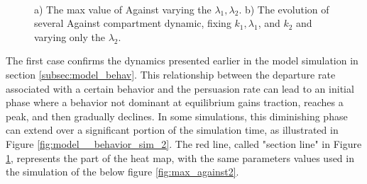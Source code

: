\begin{figure}[h]
	\centering
	 \quad
	 \\
	\caption[Max against first case]{a) The max value of Against varying the $\lambda_1, \lambda_2$. b) The evolution of several Against compartment dynamic, fixing $k_1, \lambda_1$, and $k_2$ and varying only the $\lambda_2$.}
	\label{fig:max_against}
\end{figure}
The first case confirms the dynamics presented earlier in the model simulation in section \ref{subsec:model_behav}. This relationship between the departure rate associated with a certain behavior and the persuasion rate can lead to an initial phase where a behavior not dominant at equilibrium gains traction, reaches a peak, and then gradually declines. In some simulations, this diminishing phase can extend over a significant portion of the simulation time, as illustrated in Figure \ref{fig:model__behavior_sim_2}. The red line, called "section line" in Figure \ref{fig:max_against}, represents the part of the heat map, with the same parameters values used in the simulation of the below figure \ref{fig:max_against2}.
